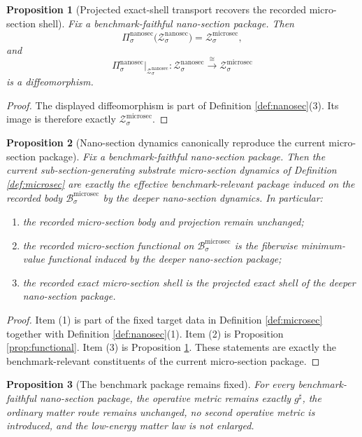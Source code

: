 \documentclass[11pt]{article}
\newcommand{\CompletedMetric}{g^{\sharp}}
\newcommand{\MicroSectionBody}[1]{\mathcal B_{#1}^{\mathrm{microsec}}}
\newcommand{\MicroSectionShell}[1]{\mathcal Z_{#1}^{\mathrm{microsec}}}
\newcommand{\NanoSectionProj}[1]{\Pi_{#1}^{\mathrm{nanosec}}}
\newcommand{\NanoSectionShell}[1]{\mathcal Z_{#1}^{\mathrm{nanosec}}}
\newtheorem{proposition}{Proposition}
\begin{document}
\begin{proposition}[Projected exact-shell transport recovers the recorded micro-section shell]
\label{prop:shell}
Fix a benchmark-faithful nano-section package. Then
\[
\NanoSectionProj{\sigma}\bigl(\NanoSectionShell{\sigma}\bigr)
=
\MicroSectionShell{\sigma},
\]
and
\[
\NanoSectionProj{\sigma}\big|_{\NanoSectionShell{\sigma}}
:
\NanoSectionShell{\sigma}\xrightarrow{\cong}\MicroSectionShell{\sigma}
\]
is a diffeomorphism.
\end{proposition}

\begin{proof}
The displayed diffeomorphism is part of Definition \ref{def:nanosec}(3). Its image is therefore exactly \(\MicroSectionShell{\sigma}\).
\end{proof}

\begin{proposition}[Nano-section dynamics canonically reproduce the current micro-section package]
\label{prop:package}
Fix a benchmark-faithful nano-section package. Then the current sub-section-generating substrate micro-section dynamics of Definition \ref{def:microsec} are exactly the effective benchmark-relevant package induced on the recorded body \(\MicroSectionBody{\sigma}\) by the deeper nano-section dynamics. In particular:
\begin{enumerate}
    \item the recorded micro-section body and projection remain unchanged;
    \item the recorded micro-section functional on \(\MicroSectionBody{\sigma}\) is the fiberwise minimum-value functional induced by the deeper nano-section package;
    \item the recorded exact micro-section shell is the projected exact shell of the deeper nano-section package.
\end{enumerate}
\end{proposition}

\begin{proof}
Item (1) is part of the fixed target data in Definition \ref{def:microsec} together with Definition \ref{def:nanosec}(1). Item (2) is Proposition \ref{prop:functional}. Item (3) is Proposition \ref{prop:shell}. These statements are exactly the benchmark-relevant constituents of the current micro-section package.
\end{proof}

\begin{proposition}[The benchmark package remains fixed]
\label{prop:boundary}
For every benchmark-faithful nano-section package, the operative metric remains exactly \(\CompletedMetric\), the ordinary matter route remains unchanged, no second operative metric is introduced, and the low-energy matter law is not enlarged.
\end{proposition}
\end{document}
